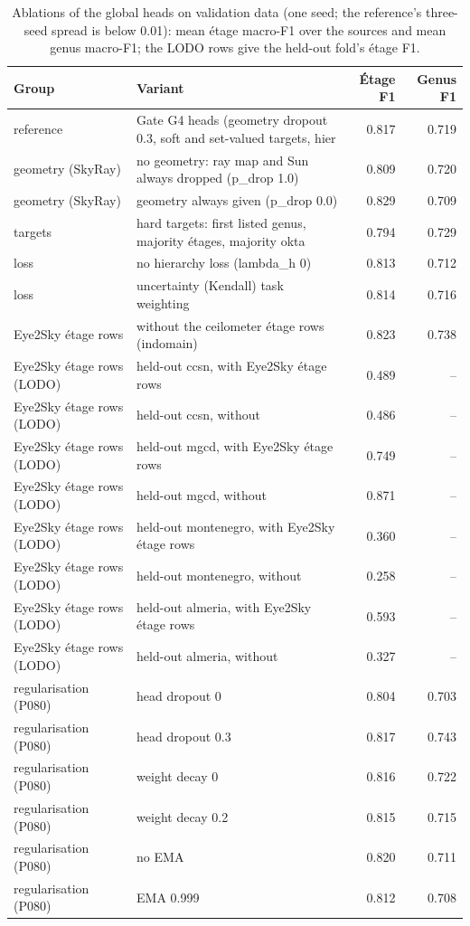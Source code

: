 \begin{table}[t]
\centering
\footnotesize
\begin{tabular}{llrr}
\toprule
Group & Variant & Étage F1 & Genus F1 \\
\midrule
reference & Gate G4 heads (geometry dropout 0.3, soft and set-valued targets, hier & 0.817 & 0.719 \\
geometry (SkyRay) & no geometry: ray map and Sun always dropped (p\_drop 1.0) & 0.809 & 0.720 \\
geometry (SkyRay) & geometry always given (p\_drop 0.0) & 0.829 & 0.709 \\
targets & hard targets: first listed genus, majority étages, majority okta & 0.794 & 0.729 \\
loss & no hierarchy loss (lambda\_h 0) & 0.813 & 0.712 \\
loss & uncertainty (Kendall) task weighting & 0.814 & 0.716 \\
Eye2Sky étage rows & without the ceilometer étage rows (indomain) & 0.823 & 0.738 \\
Eye2Sky étage rows (LODO) & held-out ccsn, with Eye2Sky étage rows & 0.489 & – \\
Eye2Sky étage rows (LODO) & held-out ccsn, without & 0.486 & – \\
Eye2Sky étage rows (LODO) & held-out mgcd, with Eye2Sky étage rows & 0.749 & – \\
Eye2Sky étage rows (LODO) & held-out mgcd, without & 0.871 & – \\
Eye2Sky étage rows (LODO) & held-out montenegro, with Eye2Sky étage rows & 0.360 & – \\
Eye2Sky étage rows (LODO) & held-out montenegro, without & 0.258 & – \\
Eye2Sky étage rows (LODO) & held-out almeria, with Eye2Sky étage rows & 0.593 & – \\
Eye2Sky étage rows (LODO) & held-out almeria, without & 0.327 & – \\
regularisation (P080) & head dropout 0 & 0.804 & 0.703 \\
regularisation (P080) & head dropout 0.3 & 0.817 & 0.743 \\
regularisation (P080) & weight decay 0 & 0.816 & 0.722 \\
regularisation (P080) & weight decay 0.2 & 0.815 & 0.715 \\
regularisation (P080) & no EMA & 0.820 & 0.711 \\
regularisation (P080) & EMA 0.999 & 0.812 & 0.708 \\
\bottomrule
\end{tabular}
\caption{Ablations of the global heads on validation data (one seed; the reference's three-seed spread is below 0.01): mean étage macro-F1 over the sources and mean genus macro-F1; the LODO rows give the held-out fold's étage F1.}
\label{tab:ablations}
\end{table}
